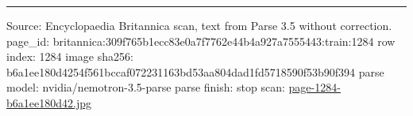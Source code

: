 \documentclass[10pt]{article}
\begin{document}
\vfill\par\noindent\rule{\linewidth}{0.4pt}\par
{\scriptsize\color{gray}\noindent Source: Encyclopaedia Britannica scan, text from Parse 3.5 without correction. page\_id: britannica:309f765b1ecc83e0a7f7762e44b4a927a7555443:train:1284 \quad row index: 1284 \quad image sha256: b6a1ee180d4254f561bccaf072231163bd53aa804dad1fd5718590f53b90f394 \quad parse model: nvidia/nemotron-3.5-parse \quad parse finish: stop \quad scan: \href{../scans/page-1284-b6a1ee180d42.jpg}{page-1284-b6a1ee180d42.jpg}\par}
\end{document}
